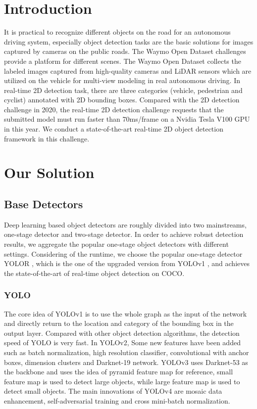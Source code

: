 \documentclass[final]{cvpr}
\begin{document}
\section{Introduction}

It is practical to recognize different objects on the road for an autonomous driving system, especially object detection tasks are the basic solutions for images captured by cameras on the public roads. The Waymo Open Dataset challenges provide a platform for different scenes. The Waymo Open Dataset \cite{sun2020scalability} collects the labeled images captured from high-quality cameras and LiDAR sensors which are utilized on the vehicle for multi-view modeling in real autonomous driving. In real-time 2D detection task, there are three categories (vehicle, pedestrian and cyclist) annotated with 2D bounding boxes. Compared with the 2D detection challenge in 2020, the real-time 2D detection challenge requests that the submitted model must run faster than 70ms/frame on a Nvidia Tesla V100 GPU in this year.
We conduct a state-of-the-art real-time 2D object detection framework in this challenge. 


\section{Our Solution}

\subsection{Base Detectors}

Deep learning based object detectors are roughly divided into two mainstreams, one-stage detector and two-stage detector. In order to achieve robust detection results, we aggregate the popular one-stage object detectors with different settings. Considering of the runtime, we choose the popular one-stage detector YOLOR \cite{wang2021you}, which is the one of the upgraded version from YOLOv1 \cite{redmon2016you}, and achieves the state-of-the-art of real-time object detection on COCO.

\subsubsection{YOLO}

The core idea of YOLOv1 is to use the whole graph as the input of the network and directly return to the location and category of the bounding box in the output layer. Compared with other object detection algorithms, the detection speed of YOLO is very fast. In YOLOv2\cite{redmon2017yolo9000}, Some new features have been added such as batch normalization, high resolution classifier, convolutional with anchor boxes, dimension clusters and Darknet-19 network. YOLOv3\cite{redmon2018yolov3} uses Darknet-53 as the backbone and uses the idea of pyramid feature map for reference, small feature map is used to detect large objects, while large feature map is used to detect small objects. The main innovations of YOLOv4\cite{sun2020scalability} are mosaic data enhancement, self-adversarial training and cross mini-batch normalization.
\end{document}
